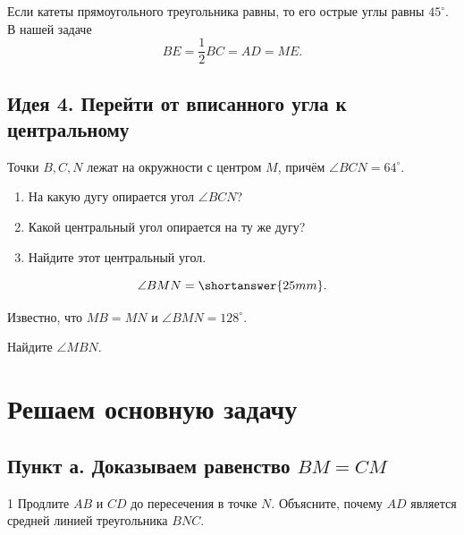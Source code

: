 \trianglebmefigure

\begin{propertybox}
Если катеты прямоугольного треугольника равны, то его острые углы равны
\(45^\circ\). В нашей задаче
\[
BE=\frac12BC=AD=ME.
\]
\end{propertybox}

\subsection{Идея 4. Перейти от вписанного угла к центральному}

\begin{trainingtask}
Точки \(B,C,N\) лежат на окружности с центром \(M\), причём
\(\angle BCN=64^\circ\).

\centralinscribedfigure

\begin{enumerate}
  \item На какую дугу опирается угол \(\angle BCN\)?
  \item Какой центральный угол опирается на ту же дугу?
  \item Найдите этот центральный угол.
\end{enumerate}

\[
\angle BMN=\shortanswer{25mm}.
\]
\end{trainingtask}

\begin{trainingtask}
Известно, что \(MB=MN\) и \(\angle BMN=128^\circ\).

\trianglebmnfigure

Найдите \(\angle MBN\).
\answerline[2]
\end{trainingtask}

\newpage
\section{Решаем основную задачу}

\subsection{Пункт а. Доказываем равенство \(BM=CM\)}

\begin{stepbox}{1}
Продлите \(AB\) и \(CD\) до пересечения в точке \(N\). Объясните, почему
\(AD\) является средней линией треугольника \(BNC\).
\answerline[3]
\end{stepbox}

